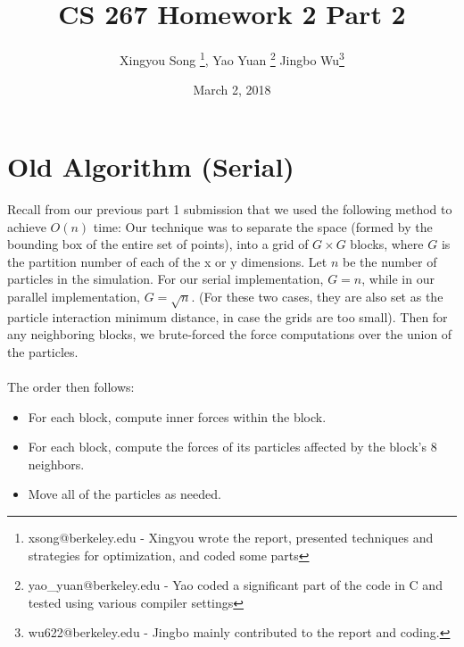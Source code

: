 \documentclass[12pt]{article}
\begin{document}
 
 
 
\title{CS 267 Homework 2 Part 2}
\author{Xingyou Song \footnote{xsong@berkeley.edu - Xingyou wrote the report, presented techniques and strategies for optimization, and coded some parts}, Yao Yuan \footnote{yao\_yuan@berkeley.edu - Yao coded a significant part of the code in C and tested using various compiler settings} Jingbo Wu\footnote{wu622@berkeley.edu - Jingbo mainly contributed to the report and coding.}} %
\date{March 2, 2018} 
\maketitle

\section{Old Algorithm (Serial)}
Recall from our previous part 1 submission that we used the following method to achieve $O(n)$ time: Our technique was to separate the space (formed by the bounding box of the entire set of points), into a grid of $G \times G$ blocks, where $G$ is the partition number of each of the x or y dimensions. Let $n$ be the number of particles in the simulation. For our serial implementation, $G = n$, while in our parallel implementation, $G = \sqrt{n}$. (For these two cases, they are also set as the particle interaction minimum distance, in case the grids are too small). Then for any neighboring blocks, we brute-forced the force computations over the union of the particles. \\\\
The order then follows: 
\begin{itemize}
  \item For each block, compute inner forces within the block.
  \item For each block, compute the forces of its particles affected by the block's 8 neighbors.
  \item Move all of the particles as needed. 
\end{itemize}
\end{document}
